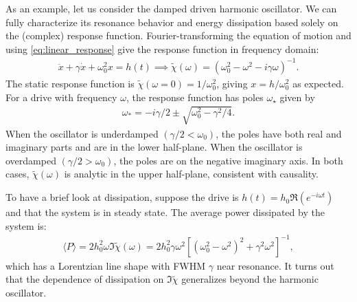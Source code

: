 \documentclass[prl,
twocolumn,
nofootinbib,
amsmath,amssymb,
aps]{revtex4-1}
\begin{document}
As an example, let us consider the damped driven harmonic oscillator. We can fully characterize its resonance behavior and energy dissipation based solely on the (complex) response function. Fourier-transforming the equation of motion and using  \eqref{eq:linear_response} give the response function in frequency domain:
\begin{align*}
\ddot{x} + \gamma \dot{x} + \omega_0^2 x = h(t) \implies 
\tilde{\chi}(\omega) = ( \omega_0^2 - \omega^2 - i \gamma \omega)^{-1}.
\end{align*}
The static response function is $\widetilde{\chi}(\omega = 0) = 1/\omega_0^2$, giving $x = h/\omega_0^2$ as expected. For a drive with frequency $\omega$, the response function has poles $\omega_\star$ given by 
\begin{align*}
\omega_* = -i\gamma/2 \pm \sqrt{\omega_0^2  - \gamma^2/4}.
\end{align*}
When the oscillator is underdamped $(\gamma/2 < \omega_0)$, the poles have both real and imaginary parts and are in the lower half-plane. When the oscillator is overdamped $(\gamma/2 > \omega_0)$, the poles are on the negative imaginary axis. In both cases, $\widetilde{\chi}(\omega)$ is analytic in the upper half-plane, consistent with causality. 

To have a brief look at dissipation, suppose the drive is $h(t) = h_0 \Re(e^{-i\omega t})$ and that the system is in steady state. The average power dissipated by the system is: 
\begin{align*}
\langle P \rangle = 2h_0^2 \omega \Im\widetilde{\chi}(\omega) = 2h_0^2  \gamma \omega^2 [(\omega_0^2 - \omega^2)^2 + \gamma^2 \omega^2]^{-1},
\end{align*}
which has a Lorentzian line shape with FWHM $\gamma$ near resonance. It turns out that the dependence of dissipation on $\Im \widetilde{\chi}$ generalizes beyond the harmonic oscillator. 
%
\end{document}

